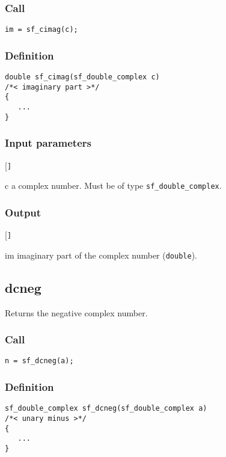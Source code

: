\subsubsection*{Call}
\begin{verbatim}im = sf_cimag(c);\end{verbatim}

\subsubsection*{Definition}
\begin{verbatim}
double sf_cimag(sf_double_complex c)
/*< imaginary part >*/
{
   ...
}
\end{verbatim}

\subsubsection*{Input parameters}
\begin{desclist}{\tt }{\quad}[\tt ]
   \setlength\itemsep{0pt}
   \item[c] a complex number. Must be of type \texttt{sf\_double\_complex}.  
\end{desclist}

\subsubsection*{Output}
\begin{desclist}{\tt }{\quad}[\tt ]
   \setlength\itemsep{0pt}
   \item[im] imaginary part of the complex number (\texttt{double}).
\end{desclist}




\subsection{{dcneg}}
Returns the negative complex number.

\subsubsection*{Call}
\begin{verbatim}n = sf_dcneg(a);\end{verbatim}

\subsubsection*{Definition}
\begin{verbatim}
sf_double_complex sf_dcneg(sf_double_complex a)
/*< unary minus >*/
{
   ...
}
\end{verbatim}

